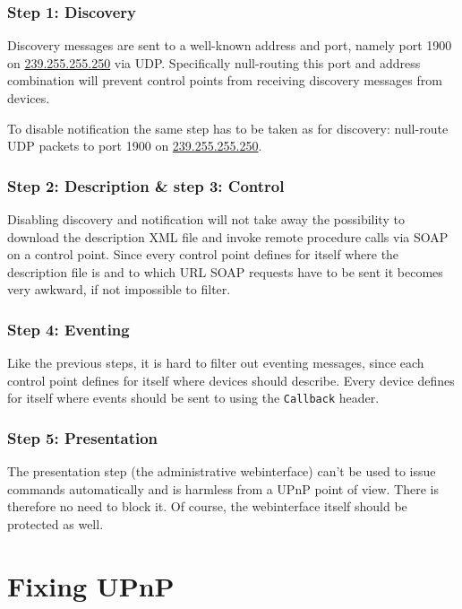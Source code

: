 \documentclass[10pt]{article}
\begin{document}
\subsubsection{Step 1: Discovery}

Discovery messages are sent to a well-known address and port, namely
port 1900 on \url{239.255.255.250} via UDP. Specifically null-routing this 
port and address combination will prevent control points from receiving
discovery messages from devices.

To disable notification the same step has to be taken as for discovery:
null-route UDP packets to port 1900 on \url{239.255.255.250}.

\subsubsection{Step 2: Description \& step 3: Control}

Disabling discovery and notification will not take away the possibility
to download the description XML file and invoke remote procedure calls via
SOAP on a control point. Since every control point defines for itself where
the description file is and to which URL SOAP requests have to be sent it
becomes very awkward, if not impossible to filter.

\subsubsection{Step 4: Eventing}

Like the previous steps, it is hard to filter out eventing messages, since
each control point defines for itself where devices should describe. Every
device defines for itself where events should be sent to using the
\texttt{Callback} header.

\subsubsection{Step 5: Presentation}

The presentation step (the administrative webinterface) can't be used to issue
commands automatically and is harmless from a UPnP point of view. There is
therefore no need to block it. Of course, the webinterface itself should be
protected as well.



\section{Fixing UPnP}
\end{document}
